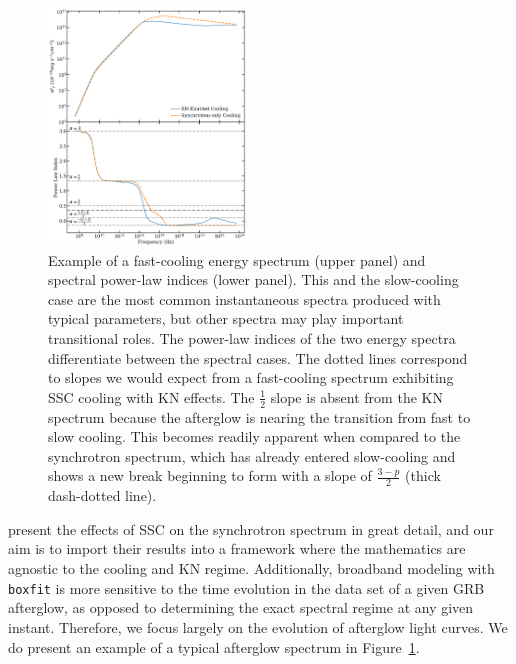 \documentclass[fleqn,usenatbib]{mnras}
\begin{document}
\begin{figure}
    \includegraphics[width=0.47\textwidth]{images/nakarI_combo.png}
    \caption{Example of a fast-cooling energy spectrum (upper panel) and spectral power-law indices (lower panel). This and the slow-cooling case are the most common instantaneous spectra produced with typical parameters, but other spectra may play important transitional roles. The power-law indices of the two energy spectra differentiate between the spectral cases. The dotted lines correspond to slopes we would expect from a fast-cooling spectrum exhibiting SSC cooling with KN effects. The $\frac{1}{2}$ slope is absent from the KN spectrum because the afterglow is nearing the transition from fast to slow cooling. This becomes readily apparent when compared to the synchrotron spectrum, which has already entered slow-cooling and shows a new break beginning to form with a slope of $\frac{3-p}{2}$ (thick dash-dotted line).}
    \label{fig:nI}
\end{figure}

\citet{Nakar} present the effects of SSC on the synchrotron spectrum in great detail, and our aim is to import their results into a framework where the mathematics are agnostic to the cooling and KN regime. Additionally, broadband modeling with \texttt{boxfit} is more sensitive to the time evolution in the data set of a given GRB afterglow, as opposed to determining the exact spectral regime at any given instant. Therefore, we focus largely on the evolution of afterglow light curves. We do present an example of a typical afterglow spectrum in Figure~\ref{fig:nI}.
\end{document}
